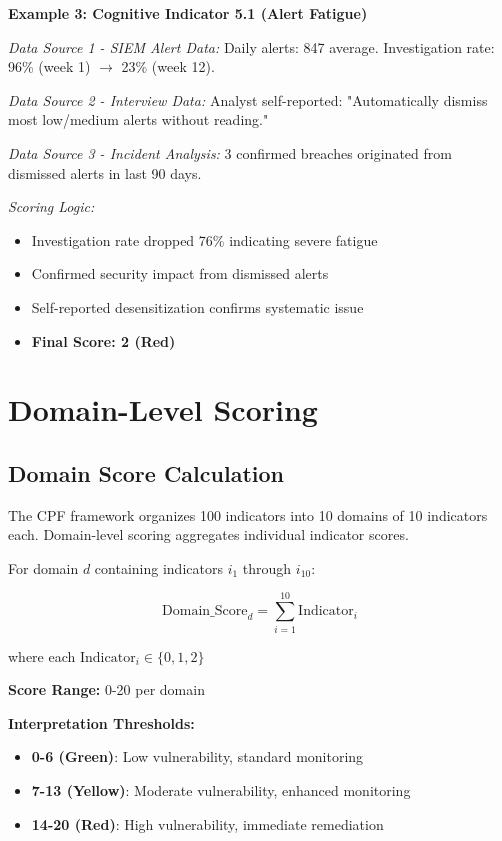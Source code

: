 \documentclass[11pt,a4paper]{article}
\begin{document}
\textbf{Example 3: Cognitive Indicator 5.1 (Alert Fatigue)}

\textit{Data Source 1 - SIEM Alert Data:}
Daily alerts: 847 average. Investigation rate: 96\% (week 1) $\rightarrow$ 23\% (week 12).

\textit{Data Source 2 - Interview Data:}
Analyst self-reported: "Automatically dismiss most low/medium alerts without reading."

\textit{Data Source 3 - Incident Analysis:}
3 confirmed breaches originated from dismissed alerts in last 90 days.

\textit{Scoring Logic:}
\begin{itemize}
\item Investigation rate dropped 76\% indicating severe fatigue
\item Confirmed security impact from dismissed alerts
\item Self-reported desensitization confirms systematic issue
\item \textbf{Final Score: 2 (Red)}
\end{itemize}

\section{Domain-Level Scoring}

\subsection{Domain Score Calculation}

The CPF framework organizes 100 indicators into 10 domains of 10 indicators each. Domain-level scoring aggregates individual indicator scores.

For domain $d$ containing indicators $i_1$ through $i_{10}$:

\begin{equation}
\text{Domain\_Score}_d = \sum_{i=1}^{10} \text{Indicator}_i
\end{equation}

where each $\text{Indicator}_i \in \{0, 1, 2\}$

\textbf{Score Range:} 0-20 per domain

\textbf{Interpretation Thresholds:}
\begin{itemize}
\item \textbf{0-6 (Green)}: Low vulnerability, standard monitoring
\item \textbf{7-13 (Yellow)}: Moderate vulnerability, enhanced monitoring
\item \textbf{14-20 (Red)}: High vulnerability, immediate remediation
\end{itemize}
\end{document}
